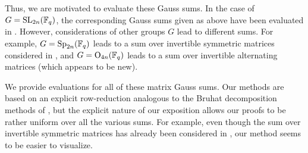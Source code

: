 \documentclass{amsart}
\begin{document}
Thus, we are motivated to evaluate these Gauss sums. In the case of $G=\mathrm{SL}_{2n}(\mathbb F_q)$, the corresponding Gauss sums given as above have been evaluated in \cite{kim-gauss-sum}. However, considerations of other groups $G$ lead to different sums. For example, $G=\mathrm{Sp}_{2n}(\mathbb F_q)$ leads to a sum over invertible symmetric matrices considered in \cite{saito-sym-gauss-sum}, and $G=\mathrm{O}_{4n}(\mathbb F_q)$ leads to a sum over invertible alternating matrices (which appears to be new).

We provide evaluations for all of these matrix Gauss sums. Our methods are based on an explicit row-reduction analogous to the Bruhat decomposition methods of \cite{kim-gauss-sum}, but the explicit nature of our exposition allows our proofs to be rather uniform over all the various sums. For example, even though the sum over invertible symmetric matrices has already been considered in \cite{saito-sym-gauss-sum}, our method seems to be easier to visualize.
\end{document}
